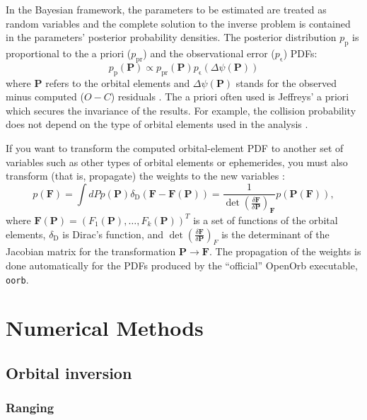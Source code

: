 \documentclass[12pt,english,twoside,a4paper]{report}
\begin{document}
In the Bayesian framework, the parameters to be estimated are treated
as random variables and the complete solution to the inverse problem
is contained in the parameters' posterior probability densities. The
posterior distribution $p_\mathrm{p}$ is proportional to the a priori
($p_\mathrm{pr}$) and the observational error ($p_\mathrm{\epsilon}$)
PDFs:
\begin{equation}
p_\mathrm{p}(\mathbf{P}) \propto p_\mathrm{pr}(\mathbf{P}) p_\mathrm{\epsilon}(\Delta
\psi (\mathbf{P}))
\end{equation}
where $\mathbf{P}$ refers to the orbital elements and $\Delta \psi
(\mathbf{P})$ stands for the observed minus computed ($O-C$) residuals
\cite{mui1993a,vir2005c}. The a priori often used is Jeffreys' a
priori which secures the invariance of the results. For example, the
collision probability does not depend on the type of orbital elements
used in the analysis \cite{vir2006a}.

If you want to transform the computed orbital-element PDF to
another set of variables such as other types of orbital elements or
ephemerides, you must also transform (that is, propagate) the weights
to the new variables \cite{mui1993a}:
\begin{equation}
p(\mathbf{F}) = \int dP p(\mathbf{P})\delta_\mathrm{D}
(\mathbf{F}-\mathbf{F}(\mathbf{P})) = \frac{1}{\det(\frac{\delta
    \mathbf{F}}{\delta \mathbf{P}})_\mathbf{F}}
p(\mathbf{P}(\mathbf{F})),
\end{equation}
where
$\mathbf{F}(\mathbf{P})=(F_1(\mathbf{P}),\ldots,F_k(\mathbf{P}))^T$ is
a set of functions of the orbital elements, $\delta_\mathrm{D}$ is
Dirac's function, and $\det(\frac{\delta \mathbf{F}}{\delta
  \mathbf{P}})_F$ is the determinant of the Jacobian matrix for the
transformation $\mathbf{P} \rightarrow \mathbf{F}$. The propagation of
the weights is done automatically for the PDFs produced by the
``official'' OpenOrb executable, \verb|oorb|.



\section{Numerical Methods} 

\subsection{Orbital inversion}

\subsubsection{Ranging}
\end{document}
